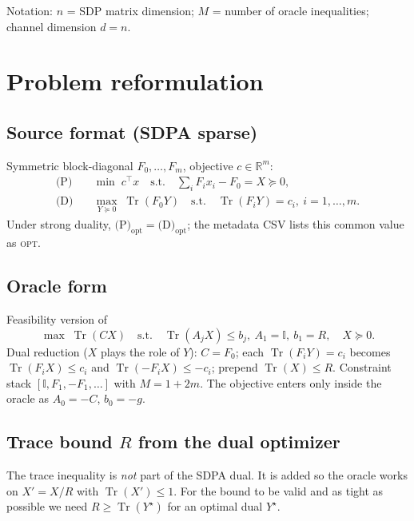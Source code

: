 \documentclass[11pt]{article}
\newcommand{\Tr}{\operatorname{Tr}}
\newcommand{\R}{\mathbb{R}}
\newcommand{\PSD}{\succeq 0}
\newcommand{\id}{\mathbb{I}}
\begin{document}
Notation: $n$ = SDP matrix dimension; $M$ = number of oracle inequalities;
channel dimension $d=n$.

\section{Problem reformulation}
\label{sec:conversion}

\subsection{Source format (SDPA sparse)}
Symmetric block-diagonal $F_0,\ldots,F_m$, objective $c\in\R^m$:
\begin{align}
\text{(P)}\quad & \min\; c^\top x
  \quad\text{s.t.}\quad \textstyle\sum_i F_i x_i - F_0 = X \PSD,\\
\text{(D)}\quad & \max_{Y\PSD}\; \Tr(F_0 Y)
  \quad\text{s.t.}\quad \Tr(F_i Y)=c_i,\ i=1,\ldots,m .
\end{align}
Under strong duality, $\text{(P)}_{\mathrm{opt}}=\text{(D)}_{\mathrm{opt}}$; the
metadata CSV lists this common value as \textsc{opt}.

\subsection{Oracle form}
Feasibility version of
\begin{equation}
\label{eq:oracleform}
\max\; \Tr(CX)\quad\text{s.t.}\quad
\Tr(A_j X)\le b_j,\ A_1=\id,\ b_1=R,\quad X\PSD .
\end{equation}
Dual reduction ($X$ plays the role of $Y$): $C=F_0$; each $\Tr(F_iY)=c_i$
becomes $\Tr(F_iX)\le c_i$ and $\Tr(-F_iX)\le -c_i$; prepend $\Tr(X)\le R$.
Constraint stack $[\id,F_1,-F_1,\ldots]$ with $M=1+2m$. The objective enters
only inside the oracle as $A_0=-C$, $b_0=-g$.

\subsection{Trace bound $R$ from the dual optimizer}
\label{sec:Rcvxpy}

The trace inequality is \emph{not} part of the SDPA dual. It is added so the
oracle works on $X'=X/R$ with $\Tr(X')\le 1$. For the bound to be valid and as
tight as possible we need $R\ge \Tr(Y^\star)$ for an optimal dual $Y^\star$.
\end{document}
